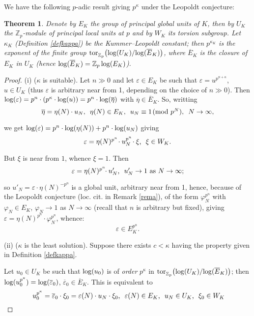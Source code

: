\documentclass[12pt]{amsart}
\newtheorem{theorem}{Theorem}[section]
\theoremstyle{definition}
\numberwithin{equation}{section}
\begin{document}
We have the following $p$-adic result giving $p^\kappa$ under 
the Leopoldt conjecture:

\begin{theorem} \label{thm} 
Denote by $E_K$ the group of principal global units of $K$, then by $U_K$ 
the ${\mathbb{Z}}_p$-module of principal local units at $p$ and by $W_K$ its torsion subgroup.
Let $\kappa_K$ (Definition \ref{defkappa}) be the Kummer--Leopoldt constant; 
then $p^{\kappa_K}$ is the exponent of the finite group 
${\rm tor}^{}_{{\mathbb{Z}}_p} \big ({\rm log} (U_K) / {\rm log} (\overline E_K)\big )$, 
where $\overline E_K$ is the closure of $E_K$ in $U_K$ (hence 
${\rm log} (\overline E_K) = {\mathbb{Z}}_p\, {\rm log} (E_K)$).
\end{theorem}

\begin{proof} (i) ($\kappa$ is suitable). Let $n \gg 0$ and let $\varepsilon \in E_K$ 
be such that $\varepsilon = u^{p^{n+\kappa}}$, $u \in U_K$ 
(thus $\varepsilon$ is arbitrary near from 1, depending on the choice of $n\gg 0$).
Then ${\rm log}(\varepsilon) =
p^n \cdot (p^\kappa \cdot {\rm log}(u)) = p^n \cdot  {\rm log}(\overline \eta)$
with $\overline \eta \in \overline E_K$. So, writting 
$$\hbox{$\overline \eta = \eta(N)\cdot u_N$, $\ \eta(N) \in E_K$,
$\  u_N \equiv 1\!\! \pmod {p^N}$, $\ N\to\infty$,}$$

we get
${\rm log}(\varepsilon) = p^n \cdot {\rm log}(\eta(N)) +p^n \cdot  {\rm log}(u_N)$ giving 
$$\hbox{$\varepsilon = \eta(N)^{p^n}\! \cdot u_N^{p^n}\! \cdot \xi$, 
$\ \xi \in W_K$.} $$

But $\xi$ is near from $1$, whence $\xi=1$. Then
$$\hbox{$\varepsilon = \eta(N)^{p^n}\!\! \cdot u'_N$, $\ u'_N \to 1$ as $N\to\infty$;}$$

so $u'_N = \varepsilon  \cdot \eta(N)^{-p^n}$ is a global unit, arbitrary near from 1, 
hence, because of the Leopoldt conjecture (loc. cit. in Remark \ref{rema}), 
of the form $\varphi_N^{p^n}$ with $\varphi_N \in E_K$, $\varphi_N\to1$ as $N \to\infty$ 
(recall that $n$ is arbitrary but fixed), giving $\varepsilon = 
\eta(N)^{p^n} \cdot \varphi_N^{p^n}$, whence:
$$\varepsilon \in E_K^{p^n}. $$

(ii) ($\kappa$ is the least solution). Suppose there exists $c < \kappa$ 
having the property given in Definition \ref{defkappa}.

\smallskip
Let $u_0 \in U_K$ be such that ${\rm log}(u_0)$ is of {\it order} $p^\kappa$ in
${\rm  tor}^{}_{{\mathbb{Z}}_p} \big ({\rm log} (U_K) / {\rm log} (\overline E_K)\big )$;
then ${\rm log}(u_0^{p^\kappa}) = {\rm log}(\overline \varepsilon_0)$, 
$\overline \varepsilon_0 \in \overline E_K$. This is equivalent to
$$\hbox{ $u_0^{p^\kappa} = \overline \varepsilon_0 \cdot \xi_0 = 
\varepsilon(N) \cdot u_N \cdot \xi_0$, $\ \varepsilon(N)\in E_K$,
$\ u_N \in U_K$, $\ \xi_0 \in W_K$} $$


\end{proof}
\end{document}
